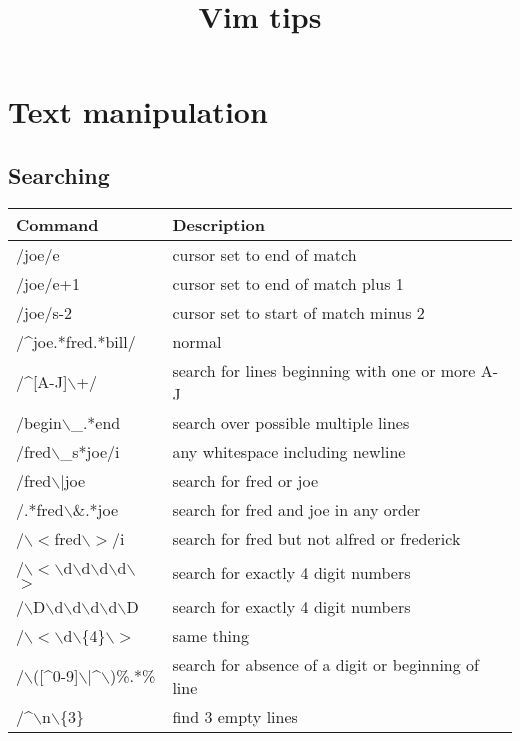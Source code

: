 \documentclass[10pt]{article}
\begin{document}
\title{Vim tips}

\maketitle
\tableofcontents
\newpage

\section{Text manipulation}

\subsection{Searching}
\begin{center}
\begin{longtable}{l|l}
\hline
Command & Description \\
\hline
\endfirsthead
\endhead
/joe/e & cursor set to end of match\\
/joe/e+1 & cursor set to end of match plus 1\\
/joe/s-2 & cursor set to start of match minus 2\\
/\^{}joe.*fred.*bill/ & normal\\
/\^{}[A-J]$\backslash$+/ & search for lines beginning with one or more A-J\\
/begin$\backslash$\_.*end & search over possible multiple lines\\
/fred$\backslash$\_s*joe/i & any whitespace including newline\\
/fred$\backslash$$|$joe & search for fred or joe\\
/.*fred$\backslash$\&.*joe & search for fred and joe in any order\\
/$\backslash$$<$fred$\backslash$$>$/i & search for fred but not alfred or frederick\\
/$\backslash$$<$$\backslash$d$\backslash$d$\backslash$d$\backslash$d$\backslash$$>$ & search for exactly 4 digit numbers\\
/$\backslash$D$\backslash$d$\backslash$d$\backslash$d$\backslash$d$\backslash$D & search for exactly 4 digit numbers\\
/$\backslash$$<$$\backslash$d$\backslash$\{4\}$\backslash$$>$ & same thing\\
/$\backslash$([\^{}0-9]$\backslash$$|$\^{}$\backslash$)\%.*\% & search for absence of a digit or beginning of line\\
/\^{}$\backslash$n$\backslash$\{3\} & find 3 empty lines\\

\end{longtable}
\end{center}
\end{document}
